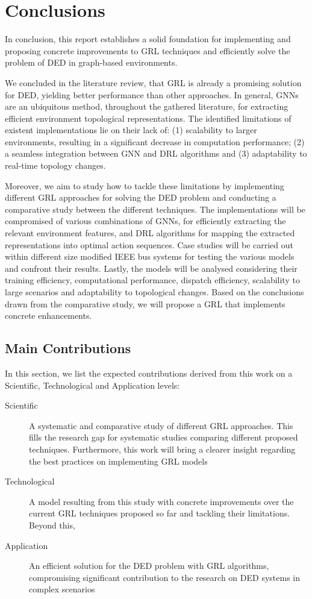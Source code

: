 \chapter{Conclusions} \label{chap:conclusion}

In conclusion, this report establishes a solid foundation for implementing and proposing concrete improvements to \ac{GRL} techniques and efficiently solve the problem of \ac{DED} in graph-based environments. \par
We concluded in the literature review, that \ac{GRL} is already a promising solution for \ac{DED}, yielding better performance than other approaches. In general, \acp{GNN} are an ubiquitous method, throughout the gathered literature, for extracting efficient environment topological representations. The identified limitations of existent implementations lie on their lack of: (1) scalability to larger environments, resulting in a significant decrease in computation performance; (2) a seamless integration between \ac{GNN} and \ac{DRL} algorithms and (3) adaptability to real-time topology changes. \par
Moreover, we aim to study how to tackle these limitations by implementing different \ac{GRL} approaches for solving the \ac{DED} problem and conducting a comparative study between the different techniques. The implementations will be compromised of various combinations of \acp{GNN}, for efficiently extracting the relevant environment features, and \ac{DRL} algorithms for mapping the extracted representations into optimal action sequences. Case studies will be carried out within different size modified IEEE bus systems for testing the various models and confront their results. Lastly, the models will be analysed considering their training efficiency, computational performance, dispatch efficiency, scalability to large scenarios and adaptability to topological changes. Based on the conclusions drawn from the comparative study, we will propose a \ac{GRL} that implements concrete enhancements.

\section{Main Contributions}

In this section, we list the expected contributions derived from this work on a Scientific, Technological and Application levels:
\begin{description}
	\item[Scientific] A systematic and comparative study of different \ac{GRL} approaches. This fills the research gap for systematic studies comparing different proposed techniques. Furthermore, this work will bring a clearer insight regarding the best practices on implementing \ac{GRL} models
	\item[Technological] A model resulting from this study with concrete improvements over the current \ac{GRL} techniques proposed so far and tackling their limitations. Beyond this, 
	\item[Application] An efficient solution for the \ac{DED} problem with \ac{GRL} algorithms, compromising significant contribution to the research on \ac{DED} systems in complex scenarios
\end{description}

